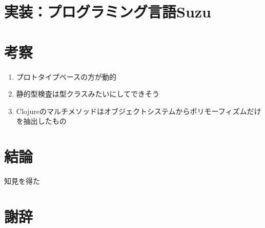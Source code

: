 \documentclass[a4paper,11pt,dvipdfmx]{jreport}
\begin{document}
\chapter{実装：プログラミング言語Suzu}

\chapter{考察}

\begin{enumerate}
\item プロトタイプベースの方が動的
\item 静的型検査は型クラスみたいにしてできそう
\item Clojureのマルチメソッドはオブジェクトシステムからポリモーフィズムだけを抽出したもの
\end{enumerate}

\chapter{結論}

知見を得た

\chapter*{謝辞}

\newpage

\renewcommand{\bibname}{参考文献}




%
%
\end{document}
